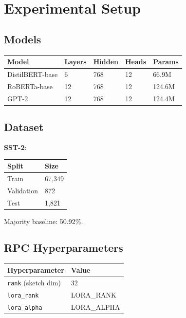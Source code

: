 
\section{Experimental Setup}

\subsection{Models}

\begin{table}[H]
\centering
\small
\begin{tabular}{lllll}
\toprule
\textbf{Model} & \textbf{Layers} & \textbf{Hidden} & \textbf{Heads} & \textbf{Params} \\
\midrule
DistilBERT-base & 6 & 768 & 12 & 66.9M \\
RoBERTa-base & 12 & 768 & 12 & 124.6M \\
GPT-2 & 12 & 768 & 12 & 124.4M \\
\bottomrule
\end{tabular}
\end{table}

\subsection{Dataset}

\textbf{SST-2}:

\begin{table}[H]
\centering
\small
\begin{tabular}{ll}
\toprule
\textbf{Split} & \textbf{Size} \\
\midrule
Train & 67,349 \\
Validation & 872 \\
Test & 1,821 \\
\bottomrule
\end{tabular}
\end{table}

Majority baseline: 50.92\%.

\subsection{RPC Hyperparameters}

\begin{table}[H]
\centering
\small
\begin{tabular}{ll}
\toprule
\textbf{Hyperparameter} & \textbf{Value} \\
\midrule
\texttt{rank} (sketch dim) & 32 \\
\texttt{lora\_rank} & {{LORA\_RANK}} \\
\texttt{lora\_alpha} & {{LORA\_ALPHA}} \\
\bottomrule
\end{tabular}
\end{table}

